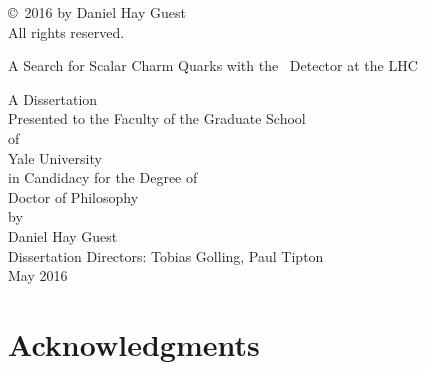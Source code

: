 \documentclass{report}
\title{\titletext}
\author{\authortext}
\newcommand{\titletext}{A Search for Scalar Charm Quarks with the \atlas\ Detector at the LHC}
\newcommand{\abstracttext}{
This thesis presents the results of a search for pair-produced scalar charm quarks with the \atlas\ detector at the LHC.
The search focuses on $20.3\,\invfb$ of data collected during the $\cmenergy$ 2012 run.
Each charm quark decays to neutrilinos and charm quarks, resulting in a final state consisting of two charm jets and missing transverse energy.
A novel ``charm tagging'' algorithm was developed to separate this signature from backgrounds, and is discussed in detail.
As no evidence of physics beyond the standard model is found, the search is used to set $95\%\,\cls$ exclusions in the scalar charm vs neutrilino mass plane.
}
\newcommand{\authortext}{Daniel Hay Guest}
\begin{document}
\begin{abstract}
  \begin{center}
    \begin{large}
      \titletext \\[0.5em]
    \end{large}
    \authortext \\[0.5em]
    2015 \\[2em]
    \begin{minipage}{\textwidth}
      \doublespacing
      \abstracttext
    \end{minipage}
  \end{center}
\end{abstract}

\thispagestyle{plain}
\null\vspace{3in}
\noindent \copyright\ 2016 by \authortext \\
All rights reserved.
\clearpage

\begin{titlepage}
  \begin{center}
    \begin{huge}
      \titletext \\
    \end{huge}
    \vspace{1in}
    A Dissertation \\
    Presented to the Faculty of the Graduate School \\
    of \\
    Yale University \\
    in Candidacy for the Degree of \\
    Doctor of Philosophy \\
    \vspace{1in}
    by \\
    \authortext \\
    \vspace{1cm}
    Dissertation Directors: Tobias Golling, Paul Tipton \\
    \vspace{1cm}
    May 2016
  \end{center}
\end{titlepage}

\chapter*{Acknowledgments}

\clearpage
\end{document}
